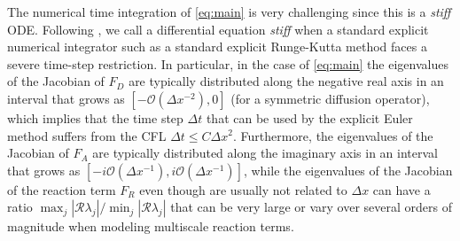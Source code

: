\documentclass[10pt,a4paper]{article}
\begin{document}
The numerical time integration of \eqref{eq:main} is very challenging since this is a \emph{stiff} ODE. {Following \cite{HaW96}}, we call a differential equation \emph{stiff} when
{a standard explicit numerical integrator such as a standard explicit Runge-Kutta method faces a severe time-step restriction}.  In particular, in the case of \eqref{eq:main} the eigenvalues of the Jacobian of $F_{D}$ are typically distributed along the negative real axis in an interval that grows as $[-\mathcal{O}(\Delta x^{-2}),0]$ (for a symmetric diffusion operator), which implies that the time step $\Delta t$ that can be used by the explicit Euler method {suffers from the CFL} $\Delta t \leq C \Delta x^{2}$. Furthermore, the eigenvalues of the Jacobian of $F_{A}$ are typically distributed along the {imaginary} axis in an interval that grows as  $[- i\mathcal{O}(\Delta x^{-1}), i \mathcal{O}(\Delta x^{-1})]$, while the eigenvalues of the Jacobian of the reaction term $F_{R}$ even though are usually not related to $\Delta x$ can have a ratio $\max_{j}|\mathcal{R} \lambda_{j}|/\min_{j}|\mathcal{R} \lambda_{j}|$ that can be very large or vary over several orders of magnitude {when modeling multiscale reaction terms}. 


        

\end{document}
